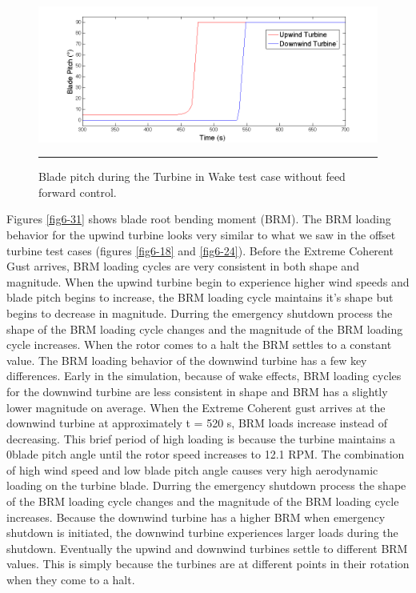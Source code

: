 \begin{figure}[htbp] \label{fig6-30}
	\centering
		\includegraphics[trim = {1cm 0 2cm 0}, clip, width = \linewidth]{Figures/ch6Figures/fig6-30.png}
		\rule{35em}{0.5pt}
	\caption{Blade pitch during the Turbine in Wake test case without feed forward control.}
\end{figure}

Figures \ref{fig6-31} shows blade root bending moment (BRM). The BRM loading behavior for the upwind turbine looks very similar to what we saw in the offset turbine test cases (figures \ref{fig6-18} and \ref{fig6-24}). Before the Extreme Coherent Gust arrives, BRM loading cycles are very consistent in both shape and magnitude. When the upwind turbine begin to experience higher wind speeds and blade pitch begins to increase, the BRM loading cycle maintains it's shape but begins to decrease in magnitude. Durring the emergency shutdown process the shape of the BRM loading cycle changes and the magnitude of the BRM loading cycle increases. When the rotor comes to a halt the BRM settles to a constant value. The BRM loading behavior of the downwind turbine has a few key differences. Early in the simulation, because of wake effects, BRM loading cycles for the downwind turbine are less consistent in shape and BRM has a slightly lower magnitude on average. When the Extreme Coherent gust arrives at the downwind turbine at approximately t = 520 s, BRM loads increase instead of decreasing. This brief period of high loading is because the turbine maintains a 0\degree blade pitch angle until the rotor speed increases to 12.1 RPM. The combination of high wind speed and low blade pitch angle causes very high aerodynamic loading on the turbine blade. Durring the emergency shutdown process the shape of the BRM loading cycle changes and the magnitude of the BRM loading cycle increases. Because the downwind turbine has a higher BRM when emergency shutdown is initiated, the downwind turbine experiences larger loads during the shutdown. Eventually the upwind and downwind turbines settle to different BRM values. This is simply because the turbines are at different points in their rotation when they come to a halt.

